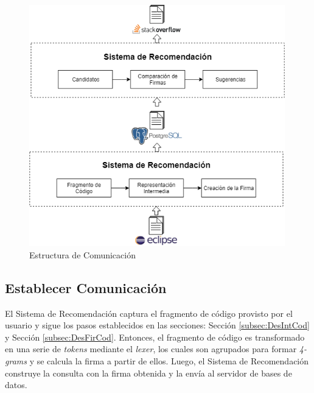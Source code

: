 \begin{figure}[h]
\centering
\includegraphics[width=30em]{img/comunicacion.png}
\caption{Estructura de Comunicación}
\label{fig:diag1}
\end{figure}

\subsection{Establecer Comunicación}

El Sistema de Recomendación 
captura el fragmento de código provisto por el usuario y sigue los pasos 
establecidos en las secciones: Sección \ref{subsec:DesIntCod} y Sección \ref{subsec:DesFirCod}.
Entonces, el fragmento de código es transformado en una serie de \textit{tokens}
mediante el \textit{lexer}, los cuales son agrupados para formar \textit{4-grams}
y se calcula la firma a partir de ellos.
Luego, el Sistema de Recomendación construye la consulta con la firma obtenida 
y la envía al servidor de bases de datos.


